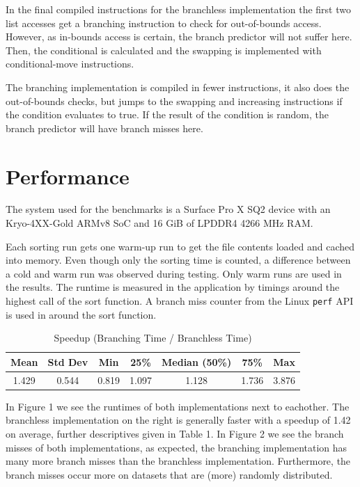 \documentclass[a4paper,10pt]{article}
\begin{document}
In the final compiled instructions for the branchless implementation the 
first two list accesses get a branching instruction to check for out-of-bounds
access. However, as in-bounds access is certain, the branch predictor will not
suffer here. Then, the conditional is calculated and the swapping is implemented
with conditional-move instructions.

The branching implementation is compiled in fewer instructions, it also does the
out-of-bounds checks, but jumps to the swapping and increasing instructions if the
condition evaluates to true. If the result of the condition is random, the branch
predictor will have branch misses here.

\section{Performance}

The system used for the benchmarks is a Surface Pro X SQ2 device 
with an Kryo-4XX-Gold ARMv8 SoC and 16 GiB of LPDDR4 4266 MHz RAM.

Each sorting run gets one warm-up run to get the file contents loaded
and cached into memory. Even though only the sorting time is counted, a
difference between a cold and warm run was observed during testing.
Only warm runs are used in the results. The runtime is measured in the
application by timings around the highest call of the sort function.
A branch miss counter from the Linux \texttt{perf} API is used in around
the sort function.

\begin{table}[h!]
    \centering
    \caption{Speedup (Branching Time / Branchless Time)}
    \label{tab:speedup_descriptive}
    \begin{tabular}{ccccccc}
        \toprule
        Mean & Std Dev & Min & 25\% & Median (50\%) & 75\% & Max \\
        \midrule
        1.429 & 0.544 & 0.819 & 1.097 & 1.128 & 1.736 & 3.876 \\
        \bottomrule
    \end{tabular}
\end{table}

In Figure 1 we see the runtimes of both implementations next to eachother. The branchless
implementation on the right is generally faster with a speedup of 1.42 on average, further
descriptives given in Table 1.
In Figure 2 we see the branch misses of both implementations, as expected, the branching 
implementation has many more branch misses than the branchless implementation. Furthermore,
the branch misses occur more on datasets that are (more) randomly distributed.
\end{document}
